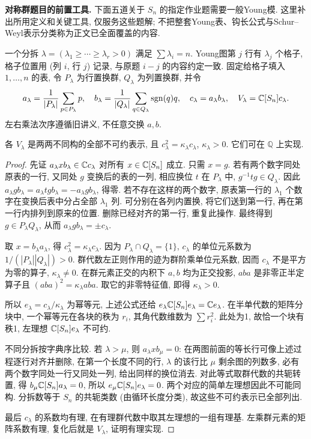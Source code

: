 \textbf{对称群题目的前置工具.}
下面五道关于 $S_n$ 的指定作业题需要一般Young模. 这里补出所用定义和关键工具, 仅服务这些题解; 不把整套Young表、钩长公式与Schur--Weyl表示分类称为正文已全面覆盖的内容.

一个分拆 $\lambda=(\lambda_1\ge\cdots\ge\lambda_r>0)$ 满足 $\sum\lambda_i=n$. Young图第 $j$ 行有 $\lambda_j$ 个格子, 格子位置用 (列 $i$, 行 $j$) 记录, 与原题 $i-j$ 的内容约定一致. 固定给格子填入 $1,\ldots,n$ 的表, 令 $P_\lambda$ 为行置换群, $Q_\lambda$ 为列置换群, 并令
\[
 a_\lambda=\frac1{|P_\lambda|}\sum_{p\in P_\lambda}p,
 \quad b_\lambda=\frac1{|Q_\lambda|}\sum_{q\in Q_\lambda}\operatorname{sgn}(q)q,
 \quad c_\lambda=a_\lambda b_\lambda,
 \quad V_\lambda=\mathbb C[S_n]c_\lambda.
\]
左右乘法次序遵循旧讲义, 不任意交换 $a,b$.

\begin{lemma}\label{hw:young-tools}
各 $V_\lambda$ 是两两不同构的全部不可约表示, 且 $c_\lambda^2=\kappa_\lambda c_\lambda$, $\kappa_\lambda>0$. 它们可在 $\mathbb Q$ 上实现.
\end{lemma}
\begin{proof}
先证 $a_\lambda x b_\lambda\in\mathbb C c_\lambda$ 对所有 $x\in\mathbb C[S_n]$ 成立. 只需 $x=g$. 若有两个数字同处原表的一行, 又同处 $g$ 变换后的表的一列, 相应换位 $t$ 在 $P_\lambda$ 中, $g^{-1}tg\in Q_\lambda$. 因此 $a_\lambda g b_\lambda=a_\lambda t g b_\lambda=-a_\lambda g b_\lambda$, 得零. 若不存在这样的两个数字, 原表第一行的 $\lambda_1$ 个数字在变换后表中分占全部 $\lambda_1$ 列. 可分别在各列内置换, 将它们送到第一行, 再在第一行内排列到原来的位置. 删除已经对齐的第一行, 重复此操作. 最终得到 $g\in P_\lambda Q_\lambda$, 从而 $a_\lambda g b_\lambda=\pm c_\lambda$.

取 $x=b_\lambda a_\lambda$, 得 $c_\lambda^2=\kappa_\lambda c_\lambda$. 因为 $P_\lambda\cap Q_\lambda=\{1\}$, $c_\lambda$ 的单位元系数为 $1/(|P_\lambda||Q_\lambda|)>0$. 群代数左正则作用的迹为群阶乘单位元系数, 因而 $c_\lambda$ 不是平方为零的算子, $\kappa_\lambda\ne0$. 在群元素正交的内积下 $a,b$ 均为正交投影, $aba$ 是非零正半定算子且 $(aba)^2=\kappa_\lambda aba$. 取它的非零特征值, 即得 $\kappa_\lambda>0$.

所以 $e_\lambda=c_\lambda/\kappa_\lambda$ 为幂等元, 上述公式还给 $e_\lambda\mathbb C[S_n]e_\lambda=\mathbb C e_\lambda$. 在半单代数的矩阵分块中, 一个幂等元在各块的秩为 $r_i$, 其角代数维数为 $\sum r_i^2$. 此处为1, 故恰一个块有秩1, 左理想 $\mathbb C[S_n]e_\lambda$ 不可约.

不同分拆按字典序比较. 若 $\lambda>\mu$, 则 $a_\lambda x b_\mu=0$: 在两图前面的等长行可像上述过程逐行对齐并删除, 在第一个长度不同的行, $\lambda$ 的该行比 $\mu$ 剩余图的列数多, 必有两个数字同处一行又同处一列, 给出同样的换位消去. 对此等式取群代数的共轭转置, 得 $b_\mu\mathbb C[S_n]a_\lambda=0$, 所以 $e_\mu\mathbb C[S_n]e_\lambda=0$. 两个对应的简单左理想因此不可能同构. 分拆数等于 $S_n$ 的共轭类数 (由循环长度分类), 故这些不可约表示已全部列出.

最后 $c_\lambda$ 的系数均有理, 在有理群代数中取其左理想的一组有理基. 左乘群元素的矩阵系数有理, 复化后就是 $V_\lambda$, 证明有理实现.
\end{proof}

